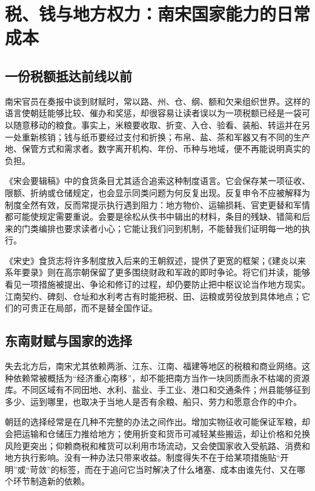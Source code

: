 \section{税、钱与地方权力：南宋国家能力的日常成本}

\subsection{一份税额抵达前线以前}

南宋官员在奏报中谈到财赋时，常以路、州、仓、纲、额和欠来组织世界。这样的语言使朝廷能够比较、催办和奖惩，却很容易让读者误以为一项税额已经是一袋可以随意移动的粮食。事实上，米粮要收取、折变、入仓、验看、装船、转运并在另一处重新核销；钱与纸币要经过支付和折换；布帛、盐、茶和军器又有不同的生产地、保管方式和需求者。数字离开机构、年份、币种与地域，便不再能说明真实的负担。

《宋会要辑稿》中的食货条目尤其适合追索这种制度语言。它会保存某一项征收、限额、折纳或仓储规定，也会显示同类问题为何反复出现。反复申令不应被解释为制度全然有效，反而常提示执行遇到阻力：地方物价、运输损耗、官吏更替和军情都可能使规定需要重说。会要是徐松从佚书中辑出的材料，条目的残缺、错简和后来的门类编排也要求读者小心；它能让我们问到机制，不能替我们证明每一地的执行。

《宋史》食货志将许多制度放入后来的王朝叙述，提供了更宽的框架；《建炎以来系年要录》则在高宗朝保留了更多围绕财政和军政的即时争论。将它们并读，能够看见一项措施被提出、争论和修订的过程，却仍要防止把中枢议论当作地方现实。江南契约、碑刻、仓址和水利考古有时能把税、田、运粮或劳役放到具体地点；它们的可贵正在局部，而不是替全国作证。

\subsection{东南财赋与国家的选择}

失去北方后，南宋尤其依赖两浙、江东、江南、福建等地区的税粮和商业网络。这种依赖常被概括为“经济重心南移”，却不能把南方当作一块同质而永不枯竭的资源库。不同区域有不同田地、水利、盐业、手工业、港口和交通条件；州县能够征到多少、运到哪里，也取决于当地人是否有余粮、船只、劳力和愿意合作的中介。

朝廷的选择经常是在几种不完整的办法之间作出。增加实物征收可能保证军粮，却会把运输和仓储压力推给地方；使用折变和货币可减轻某些搬运，却让价格和兑换风险更突出；仰赖商税和榷货可以利用市场流动，又会使国家收入受航路、消费和地方执行影响。没有一种办法只带来收益。制度得失不在于给某项措施贴“开明”或“苛敛”的标签，而在于追问它当时解决了什么堵塞、成本由谁先付、又在哪个环节制造新的依赖。

